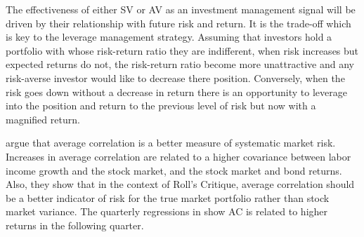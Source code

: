 The effectiveness of either SV or AV as an investment management signal will be driven by their relationship with future risk and return. It is the trade-off which is key to the leverage management strategy. Assuming that investors hold a portfolio with whose risk-return ratio they are indifferent, when risk increases but expected returns do not, the risk-return ratio become more unattractive and any risk-averse investor would like to decrease there position. Conversely, when the risk goes down without a decrease in return there is an opportunity to leverage into the position and return to the previous level of risk but now with a magnified return.

\citet{pollet_average_2010} argue that average correlation is a better measure of systematic market risk. Increases in average correlation are related to a higher covariance between labor income growth and the stock market, and the stock market and bond returns. Also, they show that in the context of Roll’s Critique, average correlation should be a better indicator of risk for the true market portfolio rather than stock market variance. \citep{roll_critique_1977} The quarterly regressions in \citet{pollet_average_2010} show AC is related to higher returns in the following quarter.